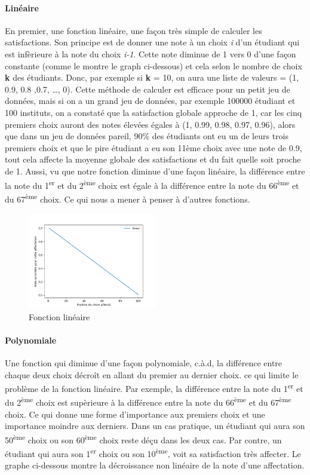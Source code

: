 \documentclass[12pt,titlepage]{article}
\begin{document}
\paragraph{Linéaire} En premier, une fonction linéaire, une façon très simple de calculer les satisfactions. Son principe est de donner une note à un choix \textit{i} d'un étudiant qui est infèrieure à la note du choix \textit{i-1}. Cette note diminue de 1 vers 0 d'une façon constante (comme le montre le graph ci-dessous) et cela selon le nombre de choix \textbf{k} des étudiants. Donc, par exemple si \textbf{k} = 10, on aura une liste de valeurs = (1, 0.9, 0.8 ,0.7, \dots, 0). 
Cette méthode de calculer est efficace pour un petit jeu de données, mais si on a un grand jeu de données, par exemple 100000 étudiant et 100 instituts, on a constaté que la satisfaction globale approche de 1, car les cinq premiers choix auront des notes élevées égales à (1, 0.99, 0.98, 0.97, 0.96), alors que dans un jeu de données pareil, 90\% des étudiants ont eu un de leurs trois premiers choix et que le pire étudiant a eu son 11ème choix avec une note de 0.9, tout cela affecte la moyenne globale des satisfactions et du fait quelle soit proche de 1. Aussi, vu que notre fonction diminue d'une façon linéaire, la différence entre la note du 1\textsuperscript{er} et du 2\textsuperscript{ème} choix est égale à la différence entre la note du 66\textsuperscript{ème} et du 67\textsuperscript{ème} choix. Ce qui nous a mener à penser à d'autres fonctions.

\begin{figure}[!h]
  \centering
  \includegraphics[width = 0.5\textwidth]{img/linear.png}
  \caption{Fonction linéaire}
\end{figure}

\paragraph{Polynomiale} Une fonction qui diminue d'une façon polynomiale, c.à.d, la différence entre  chaque deux choix décroît en allant du premier au dernier choix. ce qui limite le problème de la fonction linéaire. Par exemple, la différence entre la note du 1\textsuperscript{er} et du 2\textsuperscript{ème} choix est supèrieure à la différence entre la note du 66\textsuperscript{ème} et du 67\textsuperscript{ème} choix. Ce qui donne une forme d'importance aux premiers choix et une importance moindre aux derniers. Dans un cas pratique, un étudiant qui aura son 50\textsuperscript{ème} choix ou son 60\textsuperscript{ème} choix reste déçu dans les deux cas. Par contre, un étudiant qui aura son 1\textsuperscript{er} choix ou son 10\textsuperscript{ème}, voit sa satisfaction très affecter. Le graphe ci-dessous montre la décroissance non linéaire de la note d'une affectation. 
\end{document}
